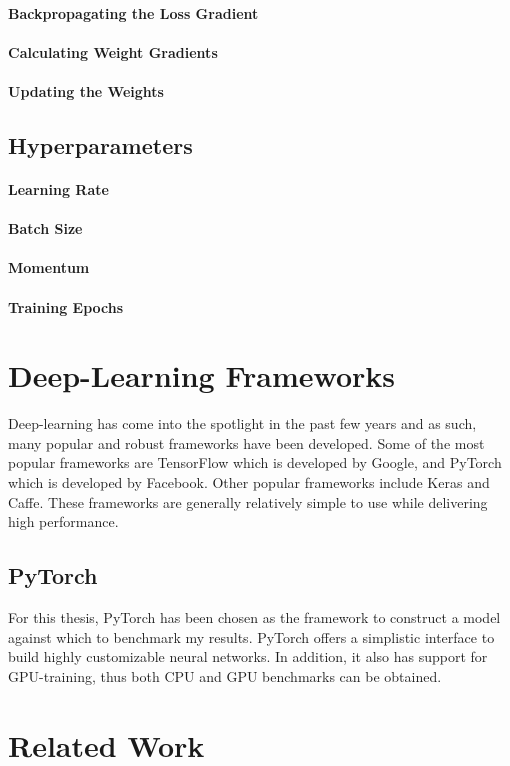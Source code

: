 \paragraph{Backpropagating the Loss Gradient}

\paragraph{Calculating Weight Gradients}

\paragraph{Updating the Weights}



\subsection{Hyperparameters}

\paragraph{Learning Rate}

\paragraph{Batch Size}

\paragraph{Momentum}

\paragraph{Training Epochs}


\section{Deep-Learning Frameworks}
Deep-learning has come into the spotlight in the past few years and as such, many popular and robust frameworks have been developed. Some of the most popular frameworks are TensorFlow which is developed by Google, and PyTorch which is developed by Facebook. Other popular frameworks include Keras and Caffe. These frameworks are generally relatively simple to use while delivering high performance. 


\subsection{PyTorch}
For this thesis, PyTorch has been chosen as the framework to construct a model against which to benchmark my results. PyTorch offers a simplistic interface to build highly customizable neural networks. In addition, it also has support for GPU-training, thus both CPU and GPU benchmarks can be obtained.

\section{Related Work}